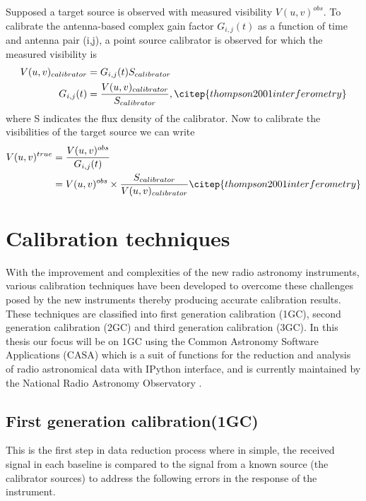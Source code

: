 Supposed a target source is observed with measured visibility $V(u,v)^{obs}$. To calibrate the antenna-based complex gain factor $G_{i,j}(t)$ as a function of time and antenna pair (i,j), a point source calibrator is observed for which the measured visibility is 
\begin{align}
V(u,v)_{calibrator}&= G_{i,j}(t) S_{calibrator}\\
G_{i,j}(t)&= \frac{V(u,v)_{calibrator}}{S_{calibrator}},
\citep{thompson2001interferometry}
\end{align}
where S indicates the flux density of the calibrator. Now to calibrate the visibilities of the target source we can write  
\begin{align}
V(u,v)^{true}&= \frac{V(u,v)^{obs}}{G_{i,j}(t)}\\
&= V(u,v)^{obs} \times \frac{S_{calibrator}}{V(u,v)_{calibrator}}
\citep{thompson2001interferometry}  
\end{align}

\section{Calibration techniques}
\label{caltech}
With the improvement and complexities of the new radio astronomy instruments, various calibration techniques have been developed to overcome these challenges  posed by the new instruments thereby producing accurate calibration results. These techniques are classified into first generation calibration (1GC), second generation calibration (2GC) and third generation calibration (3GC). In this thesis our focus will be on 1GC using the Common Astronomy Software Applications (CASA) which is a suit of functions for the reduction and analysis of radio astronomical data with IPython interface, and is currently maintained by the National Radio Astronomy Observatory \citep{mcmullin2007casa}. 

\subsection{First generation calibration(1GC)}

This is the first step in data reduction process where in simple, the received signal in each baseline is compared to the signal from a known source (the calibrator sources) to address the following errors in the response of the instrument. 

